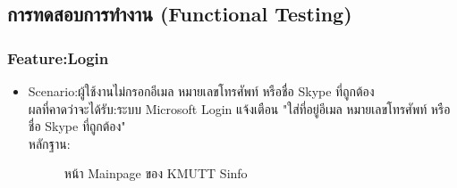 \documentclass[14pt,oneside,openright,a4paper]{cpe-thai-project}
\begin{document}
\subsection{การทดสอบการทำงาน (Functional Testing)}
\subsubsection{Feature:Login}
\begin{itemize}
  \item Scenario:ผู้ใช้งานไม่กรอกอีเมล หมายเลขโทรศัพท์ หรือชื่อ Skype ที่ถูกต้อง\\ผลที่คาดว่าจะได้รับ:ระบบ Microsoft Login แจ้งเตือน "ใส่ที่อยู่อีเมล หมายเลขโทรศัพท์ หรือชื่อ Skype ที่ถูกต้อง"\\หลักฐาน:\\
  \begin{figure}[!h]\centering
    \setlength{\fboxrule}{0.5mm} %
    \setlength{\fboxsep}{0.5cm}
    \caption{หน้า Mainpage ของ KMUTT Sinfo}\label{fig:sinfo}
  \end{figure}
\end{itemize}
\newpage
\end{document}
